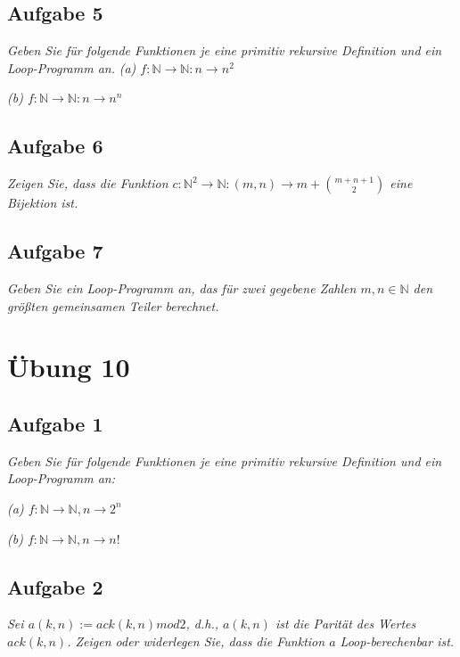 \documentclass[a4paper]{article}
\begin{document}
\subsection{Aufgabe 5}
\textit{Geben Sie für folgende Funktionen je eine primitiv rekursive Definition und ein Loop-Programm an.}
\textit{(a) $f:\mathbb{N}\rightarrow\mathbb{N}: n\rightarrow n^2$}

\textit{(b) $f:\mathbb{N}\rightarrow\mathbb{N}: n\rightarrow n^n$}


\subsection{Aufgabe 6}
\textit{Zeigen Sie, dass die Funktion $c:\mathbb{N}^2 \rightarrow\mathbb{N}: (m, n) \rightarrow m + \binom{m + n + 1}{2}$ eine Bijektion ist.}


\subsection{Aufgabe 7}
\textit{Geben Sie ein Loop-Programm an, das für zwei gegebene Zahlen $m, n \in\mathbb{N}$ den größten gemeinsamen Teiler berechnet.}




\newpage
\section{Übung 10}
\subsection{Aufgabe 1}
\textit{Geben Sie für folgende Funktionen je eine primitiv rekursive Definition und ein Loop-Programm an:}

\textit{(a) $f:\mathbb{N}\rightarrow\mathbb{N}, n \rightarrow 2^n$}

\textit{(b) $f:\mathbb{N}\rightarrow\mathbb{N}, n \rightarrow n!$ }

\subsection{Aufgabe 2}
\textit{Sei $a(k,n) := ack(k, n) mod 2$, d.h., $a(k, n)$ ist die Parität des Wertes $ack(k, n)$. Zeigen oder widerlegen Sie, dass die Funktion $a$ Loop-berechenbar ist.}
\end{document}
